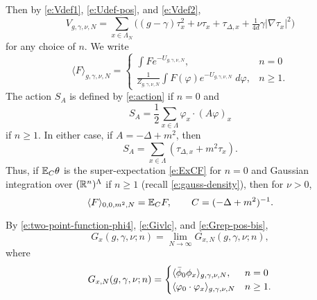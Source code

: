 Then by \eqref{e:Vdef1}, \eqref{e:Udef-pos}, and \eqref{e:Vdef2},
\begin{equation}
V_{g,\gamma,\nu,N}
	=
\sum_{x\in\Lambda_N}
\Big(
	(g - \gamma) \tau_x^2 + \nu \tau_x + \tau_{\Delta,x} + \tfrac{1}{4 d} \gamma |\nabla\tau_x|^2
\Big)
\end{equation}
for any choice of $n$.
We write
\begin{equation}
\langle F \rangle_{g,\gamma,\nu,N}
	=
\begin{cases}
\displaystyle \int F e^{-U_{g,\gamma,\nu,N}},				& n = 0 \\
\displaystyle \frac{1}{Z_{g,\gamma,\nu,N}}
	\int F(\varphi) e^{-U_{g,\gamma,\nu,N}} \; d\varphi,	& n \ge 1.
\end{cases}
\end{equation}
The action $S_A$ is defined by \eqref{e:action} if $n = 0$ and
\begin{equation}
S_A = \frac12 \sum_{x\in\Lambda} \varphi_x \cdot (A \varphi)_x
\end{equation}
if $n \ge 1$. In either case, if $A = -\Delta + m^2$, then
\begin{equation}
\label{e:SAtauDelta}
S_A = \sum_{x\in\Lambda} (\tau_{\Delta,x} + m^2 \tau_x).
\end{equation}
Thus, if $\mathbb{E}_C \theta$ is the super-expectation \eqref{e:ExCF} for $n = 0$
and Gaussian integration over $({\mathbb R}^n)^\Lambda$ if $n \ge 1$ (recall \eqref{e:gauss-density}),
then for $\nu > 0$,
\begin{equation}
\label{e:phi4-gauss}
\langle F \rangle_{0,0,m^2,N}
	=
\mathbb{E}_C F,
	\qquad
C = (-\Delta + m^2)^{-1}.
\end{equation}

By \eqref{e:two-point-function-phi4}, \eqref{e:Givlc}, and \eqref{e:Grep-pos-bis},
\begin{equation}
G_x(g, \gamma, \nu; n) = \lim_{N\to\infty} G_{x,N}(g, \gamma, \nu; n),
\end{equation}
where
\begin{equation}
G_{x,N}(g, \gamma, \nu; n)
	=
\begin{cases}
\langle \bar\phi_0 \phi_x \rangle_{g,\gamma,\nu,N},      & n = 0 \\
\langle \varphi_0 \cdot \varphi_x \rangle_{g,\gamma,\nu,N}  & n \ge 1.
\end{cases}
\end{equation}


